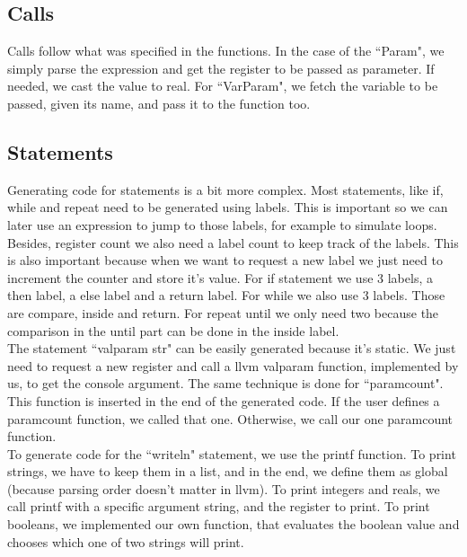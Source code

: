 \documentclass[12pt]{article}
\begin{document}
\subsection{Calls}

Calls follow what was specified in the functions. In the case of the ``Param", we simply parse the expression and get the register to be passed as parameter. If needed, we cast the value to real. For ``VarParam", we fetch the variable to be passed, given its name, and pass it to the function too.

\subsection{Statements}

Generating code for statements is a bit more complex. Most statements, like if, while and repeat need to be generated using labels. This is important so we can later use an expression to jump to those labels, for example to simulate loops. \\ 
Besides, register count we also need a label count to keep track of the labels. This is also important because when we want to request a new label we just need to increment the counter and store it's value. For if statement we use 3 labels, a then label, a else label and a return label. For while we also use 3 labels. Those are compare, inside and return. For repeat until we only need two because the comparison in the until part can be done in the inside label. \\
The statement ``valparam str" can be easily generated because it's static. We just need to request a new register and call a llvm valparam function, implemented by us, to get the console argument. The same technique is done for ``paramcount". This function is inserted in the end of the generated code. If the user defines a paramcount function, we called that one. Otherwise, we call our one paramcount function.\\
To generate code for the ``writeln" statement, we use the printf function. To print strings, we have to keep them in a list, and in the end, we define them as global (because parsing order doesn't matter in llvm). To print integers and reals, we call printf with a specific argument string, and the register to print. To print booleans, we implemented our own function, that evaluates the boolean value and chooses which one of two strings will print. \\
\end{document}
